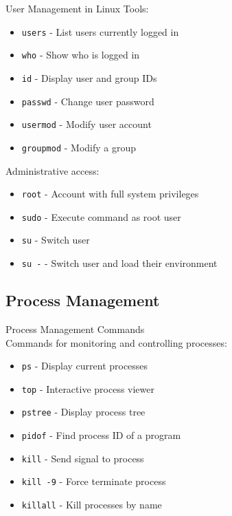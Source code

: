 \begin{definition}{User Management in Linux} Tools:
    \begin{itemize}
        \item \texttt{users} - List users currently logged in
        \item \texttt{who} - Show who is logged in
        \item \texttt{id} - Display user and group IDs
        \item \texttt{passwd} - Change user password
        \item \texttt{usermod} - Modify user account
        \item \texttt{groupmod} - Modify a group
    \end{itemize}
    
    Administrative access:
    \begin{itemize}
        \item \texttt{root} - Account with full system privileges
        \item \texttt{sudo} - Execute command as root user
        \item \texttt{su} - Switch user
        \item \texttt{su -} - Switch user and load their environment
    \end{itemize}
\end{definition}

\subsection{Process Management}

\begin{definition}{Process Management Commands}\\
    Commands for monitoring and controlling processes:
    \begin{itemize}
        \item \texttt{ps} - Display current processes
        \item \texttt{top} - Interactive process viewer
        \item \texttt{pstree} - Display process tree
        \item \texttt{pidof} - Find process ID of a program
        \item \texttt{kill} - Send signal to process
        \item \texttt{kill -9} - Force terminate process
        \item \texttt{killall} - Kill processes by name
    \end{itemize}
\end{definition}

